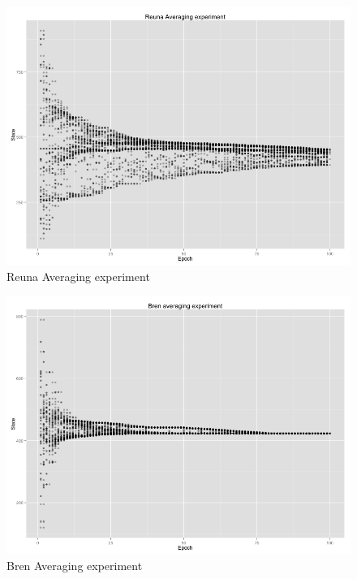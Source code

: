 \begin{figure}[h!]
	\centering
    \begin{minipage}[t]{0.47\textwidth}
    \includegraphics[width=\linewidth]{figures/Reuna Averaging experiment.png}
    Reuna Averaging experiment
    \end{minipage}
    \begin{minipage}[t]{0.47\textwidth}
    \vspace{0pt}
    \includegraphics[width=\linewidth]{figures/bren_exp_avg.png}
    Bren Averaging experiment
    \end{minipage}
    \vspace{5ex}

\end{figure}
